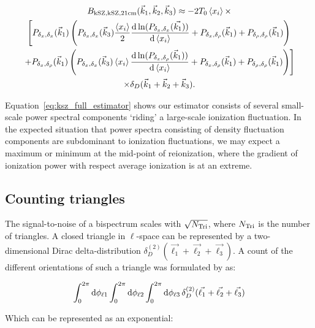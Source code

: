 \begin{multline}
B_{\rm kSZ, kSZ, {\rm 21cm}}(\vec{k}_1,\vec{k}_2,\vec{k}_3) \approx 
-2T_0\left\langle x_i \right\rangle \times \\
\left[
P_{\delta_x,\delta_x}(\vec{k}_1) \left( P_{\delta_x,\delta_x}(\vec{k}_3)\frac{\left\langle x_i \right\rangle}{2} \frac{{\rm d} \ln (P_{\delta_x,\delta_x}(\vec{k_1}))}{{\rm d}\left\langle x_i \right\rangle} + P_{\delta_x,\delta_{\rho}}(\vec{k}_1) + P_{\delta_{\rho},\delta_{\rho}}(\vec{k}_1) \right) \right. \\
\left.
+ P_{\delta_x,\delta_{\rho}}(\vec{k}_1) \left( P_{\delta_x,\delta_x}(\vec{k}_3)\left\langle x_i \right\rangle \frac{{\rm d} \ln (P_{\delta_x,\delta_{\rho}}(\vec{k}_1))}{{\rm d}\left\langle x_i \right\rangle} + P_{\delta_x,\delta_{\rho}}(\vec{k}_1) + P_{\delta_{\rho},\delta_{\rho}}(\vec{k}_1) \right)
\right] \\
\times \delta_D(\vec{k}_1+\vec{k}_2+\vec{k}_3).
\label{eq:ksz_full_estimator}
\end{multline}

Equation~\ref{eq:ksz_full_estimator} shows our estimator consists of several small-scale power spectral components `riding' a large-scale ionization fluctuation. In the expected situation that power spectra consisting of density fluctuation components are subdominant to ionization fluctuations, we may expect a maximum or minimum at the mid-point of reionization, where the gradient of ionization power with respect average ionization is at an extreme.

\subsection{Counting triangles}

The signal-to-noise of a bispectrum scales with $\sqrt{N_{\rm Tri}}$, where $N_{\rm Tri}$ is the number of triangles.
A closed triangle in $\ell$-space can be represented by a two-dimensional Dirac delta-distribution $\delta^{(2)}_{D}(\vec{\ell_1}+\vec{\ell_2}+\vec{\ell_3})$. A count of the different orientations of such a triangle was formulated by \cite{Joachimi.09} as:

\begin{equation}
\int^{2\pi}_0 {\rm d}\phi_{\ell1} \int^{2\pi}_0 {\rm d}\phi_{\ell2} \int^{2\pi}_0 {\rm d}\phi_{\ell3} \,\delta^{(2)}_{D}(\vec{\ell_1}+\vec{\ell_2}+\vec{\ell_3})
\end{equation}

Which can be represented as an exponential:

